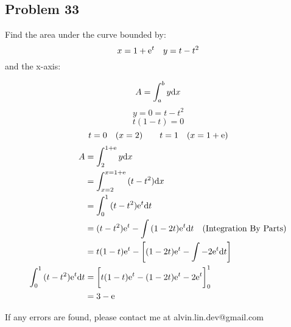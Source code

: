 \documentclass[letterpaper, 12pt]{math}
\begin{document}
\subsection*{Problem 33}
Find the area under the curve bounded by:
\[ x = 1+\mathrm{e}^{t} \quad y = t-t^{2} \]
and the x-axis:
\begin{center}
\end{center}
\[ A = \int_{a}^{b}{y\mathrm{d}{x}} \]
\[ y = 0 = t-t^{2} \]
\[ t(1-t) = 0 \]
\[ t = 0 \quad (x = 2) \quad \quad t = 1 \quad (x=1+\mathrm{e}) \]
\begin{align*}
  A &= \int_{2}^{1+\mathrm{e}}{y\mathrm{d}{x}} \\
  &= \int_{x=2}^{x=1+\mathrm{e}}{(t-t^{2})\mathrm{d}{x}} \\
  &= \int_{0}^{1}{(t-t^{2})\mathrm{e}^{t}\mathrm{d}{t}} \\
  &= (t-t^{2})\mathrm{e}^{t}-\int{(1-2t)\mathrm{e}^{t}\mathrm{d}{t}}
    \quad\mathrm{(Integration\ By\ Parts)} \\
  &= t(1-t)\mathrm{e}^{t}-\bigg[(1-2t)\mathrm{e}^{t}-\int{-2\mathrm{e}^{t}\mathrm{d}{t}}\bigg] \\
  \int_{0}^{1}{(t-t^{2})\mathrm{e}^{t}\mathrm{d}{t}} &=
    \bigg[t(1-t)\mathrm{e}^{t}-(1-2t)\mathrm{e}^{t}-2\mathrm{e}^{t}\bigg]_{0}^{1} \\
  &= 3-\mathrm{e}
\end{align*}

\begin{center}
  If any errors are found, please contact me at alvin.lin.dev@gmail.com
\end{center}
\end{document}
